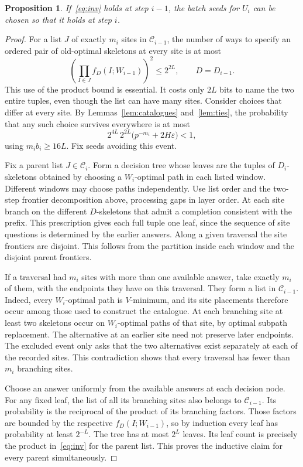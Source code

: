 \documentclass[11pt]{article}
\newtheorem{proposition}[theorem]{Proposition}
\newcommand{\calC}{\mathcal C}
\begin{document}
\begin{proposition}\label{prop:ind}
If~\eqref{eq:inv} holds at step $i-1$, the batch seeds for $U_i$ can
be chosen so that it holds at step $i$.
\end{proposition}
\begin{proof}
For a list $J$ of exactly $m_i$ sites in $\calC_{i-1}$, the number of ways
to specify an ordered pair of old-optimal skeletons at every site is at most
\[
                   \left(\prod_{I\in J}f_D(I;W_{i-1})\right)^2\le 2^{2L},
                   \qquad D=D_{i-1}.
\]
This use of the product bound is essential. It costs only $2L$ bits to
name the two entire tuples, even though the list can have many sites.
Consider choices that differ at every site. By Lemmas~\ref{lem:catalogues}
and~\ref{lem:ties}, the probability that any such choice survives
everywhere is at most
\[
          2^{4L}\,2^{2L}\bigl(p^{-m_i}+2H\varepsilon\bigr)<1,
\]
using $m_i b_i\ge16L$. Fix seeds avoiding this event.

Fix a parent list $J\in\calC_i$. Form a decision tree whose leaves are
the tuples of $D_i$-skeletons obtained by choosing a $W_i$-optimal path
in each listed window. Different windows may choose paths independently.
Use list order and the two-step frontier decomposition above, processing
gaps in layer order. At each site branch on the different $D$-skeletons
that admit a completion consistent with the prefix. This prescription
gives each full tuple one leaf, since the sequence of site questions
is determined by the earlier answers. Along a given traversal the
site frontiers are disjoint. This follows from the partition inside
each window and the disjoint parent frontiers.

If a traversal had $m_i$ sites with more than one available answer,
take exactly $m_i$ of them, with the endpoints they have on this traversal.
They form a list in $\calC_{i-1}$. Indeed, every $W_i$-optimal path
is $V$-minimum, and its site placements therefore occur among those used
to construct the catalogue. At each branching site at least two skeletons
occur on $W_i$-optimal paths of that site, by optimal subpath replacement.
The alternative at an earlier site need not preserve later endpoints.
The excluded event only asks that the two alternatives exist separately
at each of the recorded sites. This contradiction shows that every
traversal has fewer than $m_i$ branching sites.

Choose an answer uniformly from the available answers at each decision
node. For any fixed leaf, the list of all its branching sites also belongs
to $\calC_{i-1}$. Its probability is the reciprocal of the product of
its branching factors. Those factors are bounded by the respective
$f_D(I;W_{i-1})$, so by induction every leaf has probability at least
$2^{-L}$. The tree has at most $2^L$ leaves. Its leaf count is precisely
the product in~\eqref{eq:inv} for the parent list. This proves the
inductive claim for every parent simultaneously.
\end{proof}
\end{document}
